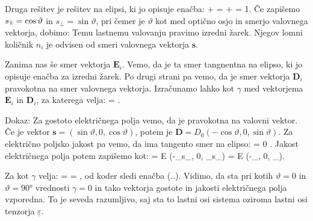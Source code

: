 Druga rešitev je rešitev na elipsi, ki jo opisuje enačba:
\beq
{}+  = 
+  = 
1.
\eeq
Če zapišemo $s_\myparallel = \cos \vartheta$ in $s_\perp = \sin \vartheta$, pri čemer je 
$\vartheta$ kot med optično osjo in smerjo valovnega vektorja, dobimo:
Temu lastnemu valovanju pravimo izredni žarek. Njegov lomni količnik $n_i$ je odvisen od 
smeri valovnega vektorja $\mathbf{s}$. 

Zanima nas še smer vektorja $\mathbf{E}_i$. Vemo, da je ta smer tangnentna na elipso, ki jo 
opisuje enačba za izredni žarek. Po drugi strani pa vemo, da je smer vektorja $\mathbf{D}_i$ pravokotna na
smer valovnega vektorja. Izračunamo lahko kot $\gamma$ med vektorjema $\mathbf{E}_i$ in $\mathbf{D}_i$, za
katerega velja:
\beq
\cos \gamma = .
\eeq

Dokaz: Za gostoto električnega polja vemo, da je pravokotna na valovni vektor. Če je vektor
$\mathbf{s} = (\sin\vartheta, 0, \cos\vartheta)$, potem je $\mathbf{D} = D_0(-\cos\vartheta, 0, 
\sin\vartheta)$. Za električno poljsko jakost pa vemo, da ima tangento smer na elipso:
\beq
{} = 0\frac{\varepsilon_\perp}{\varepsilon_\myparallel} .
\eeq
Jakost električnega polja potem zapišemo kot:
\beq
{} = E (-\varepsilon_\myparallel s_\myparallel, 0, \varepsilon_\perp s_\perp) = 
E (-\varepsilon_\myparallel \cos \vartheta, 0, \varepsilon_\perp \sin \vartheta).
\eeq

Za kot $\gamma$ velja:
\beq
\cos \gamma =  = \frac{\varepsilon_\myparallel \cos^2\vartheta
+ \varepsilon_\perp \sin^2\vartheta}{{\sqrt{\cos^2\vartheta}+ \sin^2\vartheta}
\sqrt{\varepsilon_\myparallel^2 \cos^2\vartheta + \varepsilon_\perp^2 \sin^2\vartheta}},
\eeq
od koder sledi enačba (..). Vidimo, da sta pri kotih $\vartheta = 0$ in $\vartheta = 90\si{\degree}$
vrednosti $\gamma=0$ in tako vektorja gostote in jakosti električnega polja vzporedna. 
To je seveda razumljivo, saj sta to lastni osi sistema oziroma lastni osi tenzorja $\underline{\varepsilon}$.

